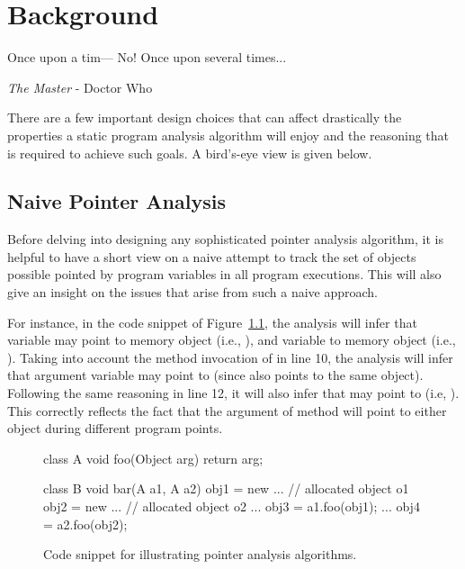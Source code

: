 \chapter{Background}
\label{chapter:background}
\epigraph{Once upon a tim--- No! Once upon several times...}{\textit{The Master} - Doctor Who}

There are a few important design choices that can affect drastically the properties a static program analysis algorithm will enjoy and the reasoning that is required to achieve such goals. A bird's-eye view is given below.

\section{Naive Pointer Analysis}
\label{sec:back:insens}

Before delving into designing any sophisticated pointer analysis algorithm, it is helpful to have a short view on a naive attempt to track the set of objects possible pointed by program variables in all program executions. This will also give an insight on the issues that arise from such a naive approach.

For instance, in the code snippet of Figure~\ref{fig:back:snippet}, the analysis will infer that variable  may point to memory object  (i.e., ), and variable  to memory object  (i.e., ). Taking into account the method invocation of  in line 10, the analysis will infer that argument variable  may point to  (since  also points to the same object). Following the same reasoning in line 12, it will also infer that  may point to  (i.e, ). This correctly reflects the fact that the argument of method  will point to either object during different program points.

\begin{figure}[htp]
\begin{javacode}
class A {
    void foo(Object arg) { return arg; }
}

class B {
    void bar(A a1, A a2) {
        obj1 = new ...  // allocated object o1
        obj2 = new ...  // allocated object o2
        ...
        obj3 = a1.foo(obj1);
        ...
        obj4 = a2.foo(obj2);
    }
}
\end{javacode}
\caption[Code snippet for illustrating pointer analysis]{Code snippet for illustrating pointer analysis algorithms.}
\label{fig:back:snippet}
\end{figure}

